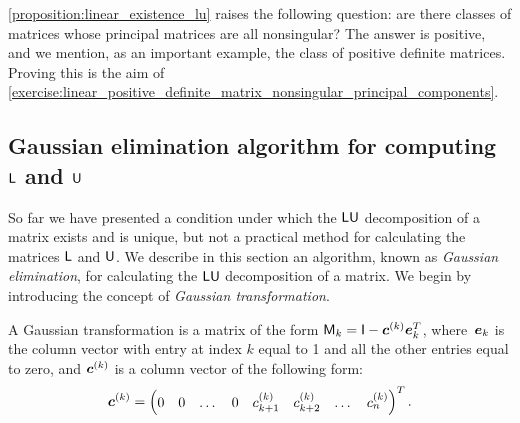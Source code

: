 
\cref{proposition:linear_existence_lu} raises the following question:
are there classes of matrices whose principal matrices are all nonsingular?
The answer is positive, and we mention,
as an important example, the class of positive definite matrices.
Proving this is the aim of \cref{exercise:linear_positive_definite_matrix_nonsingular_principal_components}.

\subsection*{Gaussian elimination algorithm for computing $\mathsf L$ and $\mathsf U$}%
\label{sub:gaussian_elimination_algorithm_for_computing_mat_l_and_mat_u_}

So far we have presented a condition under which the $\mathsf L \mathsf U$ decomposition of a matrix exists and is unique,
but not a practical method for calculating the matrices $\mathsf L$ and $\mathsf U$.
We describe in this section an algorithm,
known as \emph{Gaussian elimination},
for calculating the $\mathsf L \mathsf U$ decomposition of a matrix.
We begin by introducing the concept of \emph{Gaussian transformation}.
\begin{definition}
    A Gaussian transformation is a matrix of the form $\mathsf M_k = \mathsf I - \mathbf{\boldsymbol{c}}^{(k)} \mathbf{\boldsymbol{e}}_k^T$,
    where~$\mathbf{\boldsymbol{e}}_k$ is the column vector with entry at index $k$ equal to 1 and all the other entries equal to zero,
    and $\mathbf{\boldsymbol{c}}^{(k)}$ is a column vector of the following form:
    \[
        \mathbf{\boldsymbol{c}}^{(k)} =
        \begin{pmatrix}
            0 & 0 & \dots & 0 & c^{(k)}_{k+1} & c^{(k)}_{k+2} & \dots & c^{(k)}_n
        \end{pmatrix}^T.
    \]
\end{definition}

